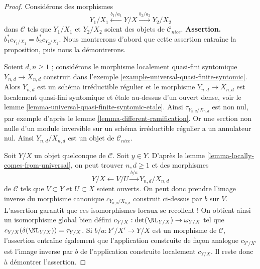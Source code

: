 \begin{proof}
\medskip\noindent
Considérons des morphismes
$$
Y_1/X_1 \xleftarrow{b_1/a_1} Y/X \xrightarrow{b_2/a_2} Y_2/X_2
$$
dans $\mathcal{C}$ tels que $Y_1/X_1$ et $Y_2/X_2$ soient des objets
de $\mathcal{C}_{nice}$. {\bf Assertion.} $b_1^*c_{Y_1/X_1} = b_2^*c_{Y_2/X_2}$.
Nous montrerons d'abord que cette assertion entraîne la proposition,
puis nous la démontrerons.

\medskip\noindent
Soient $d, n \geq 1$ ; considérons le morphisme localement
quasi-fini syntomique $Y_{n, d} \to X_{n, d}$
construit dans l'exemple \ref{example-universal-quasi-finite-syntomic}.
Alors $Y_{n, d}$ est un schéma irréductible régulier et le
morphisme $Y_{n, d} \to X_{n, d}$ est localement quasi-fini syntomique
et étale au-dessus d'un ouvert dense, voir le
lemme \ref{lemma-universal-quasi-finite-syntomic-etale}.
Ainsi $\tau_{Y_{n, d}/X_{n, d}}$ est non nul, par exemple d'après le
lemme \ref{lemma-different-ramification}. Or une section non nulle
d'un module inversible sur un schéma irréductible régulier
a un annulateur nul. Ainsi
$Y_{n, d}/X_{n, d}$ est un objet de $\mathcal{C}_{nice}$.

\medskip\noindent
Soit $Y/X$ un objet quelconque de $\mathcal{C}$. Soit $y \in Y$.
D'après le lemme \ref{lemma-locally-comes-from-universal}, on peut trouver
$n, d \geq 1$ et des morphismes
$$
Y/X \leftarrow V/U \xrightarrow{b/a} Y_{n, d}/X_{n, d}
$$
de $\mathcal{C}$ tels que $V \subset Y$ et $U \subset X$ soient ouverts.
On peut donc prendre l'image inverse du morphisme canonique $c_{Y_{n, d}/X_{n, d}}$
construit ci-dessus par $b$ sur $V$. L'assertion garantit que ces isomorphismes
locaux se recollent ! On obtient ainsi un isomorphisme global bien défini
$c_{Y/X} : \det(\NL_{Y/X}) \to \omega_{Y/X}$ tel que
$c_{Y/X}(\delta(\NL_{Y/X})) = \tau_{Y/X}$.
Si $b/a : Y'/X' \to Y/X$ est un morphisme de $\mathcal{C}$,
l'assertion entraîne également que l'application construite de façon analogue
$c_{Y'/X'}$ est l'image inverse par $b$ de l'application construite localement
$c_{Y/X}$. Il reste donc à démontrer l'assertion.


\end{proof}
